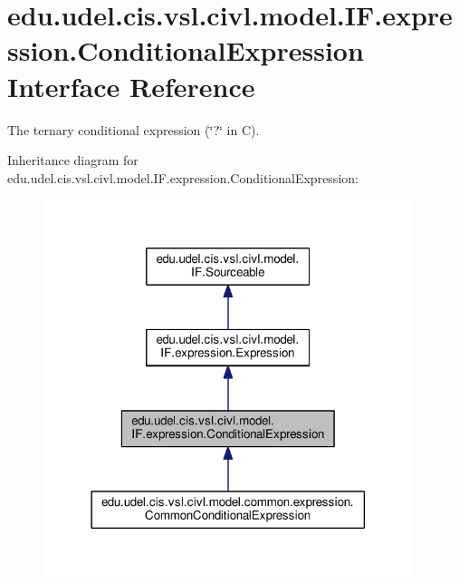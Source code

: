 \hypertarget{interfaceedu_1_1udel_1_1cis_1_1vsl_1_1civl_1_1model_1_1IF_1_1expression_1_1ConditionalExpression}{}\section{edu.\+udel.\+cis.\+vsl.\+civl.\+model.\+I\+F.\+expression.\+Conditional\+Expression Interface Reference}
\label{interfaceedu_1_1udel_1_1cis_1_1vsl_1_1civl_1_1model_1_1IF_1_1expression_1_1ConditionalExpression}


The ternary conditional expression (\char`\"{}?\char`\"{} in C).  




Inheritance diagram for edu.\+udel.\+cis.\+vsl.\+civl.\+model.\+I\+F.\+expression.\+Conditional\+Expression\+:
\nopagebreak
\begin{figure}[H]
\begin{center}
\leavevmode
\includegraphics[width=306pt]{interfaceedu_1_1udel_1_1cis_1_1vsl_1_1civl_1_1model_1_1IF_1_1expression_1_1ConditionalExpression__inherit__graph}
\end{center}
\end{figure}


